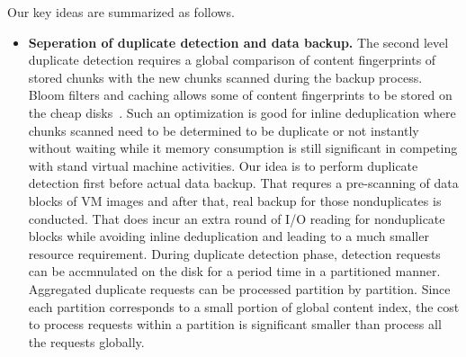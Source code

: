 Our key ideas are summarized as follows.
\begin{itemize}


\item {\bf Seperation of duplicate detection and data backup.}
The second level duplicate detection requires a global comparison of 
content fingerprints of stored chunks with the new chunks scanned during 
the backup process. Bloom filters and caching allows some of content 
fingerprints to be stored on the cheap disks~\cite{bottleneck08}. Such an optimization is good 
for inline deduplication where chunks scanned need to be determined to be duplicate or not instantly without 
waiting while  it memory consumption is still significant in competing with stand virtual 
machine activities.  Our idea is to perform duplicate detection first before actual data backup.
That requres a pre-scanning of  data  blocks of VM images and after that, real backup  for those nonduplicates
is conducted. That does incur an extra  round of I/O reading for nonduplicate blocks while avoiding inline 
deduplication and leading to a much smaller resource requirement. 
During duplicate detection phase, detection requests can be accmnulated on the disk 
for a period time  in a  partitioned manner.  Aggregated duplicate requests can be processed partition by partition. 
Since each partition corresponds to a small portion of global content index, the cost to 
process requests within a partition is significant smaller than process all the requests globally.


\end{itemize}
